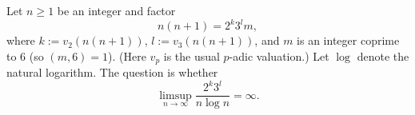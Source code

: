 Let $n\ge 1$ be an integer and factor
\[
 n(n+1)=2^k3^l m,
\]
where $k:=v_2(n(n+1))$, $l:=v_3(n(n+1))$, and $m$ is an integer coprime to $6$ (so $(m,6)=1$).
(Here $v_p$ is the usual $p$-adic valuation.)
Let $\log$ denote the natural logarithm.
The question is whether
\[
\limsup_{n\to\infty} \frac{2^k3^l}{n\log n}=\infty.
\]
